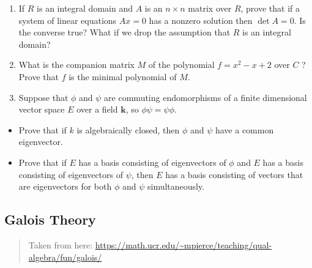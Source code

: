 \begin{enumerate}
\def\labelenumi{\arabic{enumi}.}
\setcounter{enumi}{3}
\tightlist
\item
  If \(R\) is an integral domain and \(A\) is an \(n \times n\) matrix
  over \(R\), prove that if a system of linear equations \(A x=0\) has a
  nonzero solution then \(\operatorname{det} A=0\). Is the converse
  true? What if we drop the assumption that \(R\) is an integral domain?
\item
  What is the companion matrix \(M\) of the polynomial \(f=x^{2}-x+2\)
  over \(C\) ? Prove that \(f\) is the minimal polynomial of \(M\).
\item
  Suppose that \(\phi\) and \(\psi\) are commuting endomorphisms of a
  finite dimensional vector space \(E\) over a field \(\boldsymbol{k}\),
  so \(\phi \psi=\psi \phi\).
\end{enumerate}

\begin{itemize}
\tightlist
\item
  Prove that if \(k\) is algebraically closed, then \(\phi\) and
  \(\psi\) have a common eigenvector.
\item
  Prove that if \(E\) has a basis consisting of eigenvectors of \(\phi\)
  and \(E\) has a basis consisting of eigenvectors of \(\psi\), then
  \(E\) has a basis consisting of vectors that are eigenvectors for both
  \(\phi\) and \(\psi\) simultaneously.
\end{itemize}

\hypertarget{galois-theory}{%
\subsection{Galois Theory}\label{galois-theory}}

\begin{quote}
Taken from here:
\url{https://math.ucr.edu/~mpierce/teaching/qual-algebra/fun/galois/}
\end{quote}

